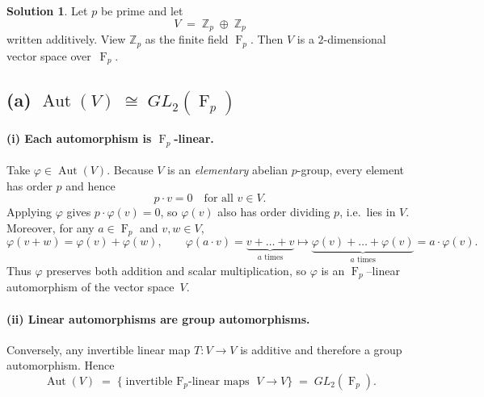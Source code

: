 \documentclass[12pt]{article}
\DeclareMathOperator{\F}{F}
\theoremstyle{definition} %
\newtheorem{solution}{Solution}
\theoremstyle{plain} %
\begin{document}
                      \begin{solution}
                        Let $p$ be prime and let 
                        \[
                                V \;=\; \mathbb{Z}_{p}\;\oplus\;\mathbb{Z}_{p}
                        \]
                        written additively.  View $\mathbb{Z}_{p}$ as the finite field
                        $\F_{p}$.  Then $V$ is a $2$-dimensional vector space over~$\F_{p}$.
                        
                        \subsection*{(a)  $\operatorname{Aut}(V)\;\cong\;GL_{2}(\F_{p})$}
                        
                        \paragraph{(i)  Each automorphism is $\F_{p}$-linear.}
                        Take $\varphi\in\operatorname{Aut}(V)$.
                        Because $V$ is an \emph{elementary} abelian $p$-group, every element has order
                        $p$ and hence
                        \[
                                p\cdot v = 0\quad\text{for all }v\in V.
                        \]
                        Applying $\varphi$ gives $p\cdot\varphi(v)=0$, so $\varphi(v)$ also has
                        order dividing $p$, i.e.\ lies in $V$.  
                        Moreover, for any $a\in\F_{p}$ and $v,w\in V$,
                        \[
                                \varphi(v+w)=\varphi(v)+\varphi(w),
                                \qquad
                                \varphi(a\cdot v)
                                = \underbrace{v+\dots+v}_{a\text{ times}}
                                  \mapsto
                                  \underbrace{\varphi(v)+\dots+\varphi(v)}_{a\text{ times}}
                                = a\cdot\varphi(v).
                        \]
                        Thus $\varphi$ preserves both addition and scalar multiplication, so
                        $\varphi$ is an $\F_{p}$–linear automorphism of the vector space~$V$.
                        
                        \paragraph{(ii)  Linear automorphisms are group automorphisms.}
                        Conversely, any invertible linear map
                        $T:V\to V$ is additive and therefore a group automorphism.
                        Hence
                        \[
                               \operatorname{Aut}(V)
                               \;=\;
                               \bigl\{\text{invertible $\F_{p}$-linear maps }V\to V\bigr\}
                               \;=\;
                               GL_{2}(\F_{p}).
                        \]
                        

\end{solution}
\end{document}
